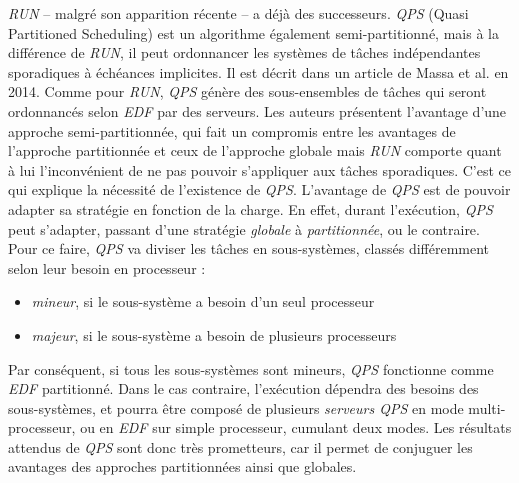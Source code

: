 	\textit{RUN} -- malgré son apparition récente -- a déjà des successeurs. \textit{QPS}
	(Quasi Partitioned Scheduling) est un algorithme 
	également semi-partitionné, mais à la différence de \textit{RUN}, il peut ordonnancer les systèmes de tâches indépendantes sporadiques à échéances implicites. 
	Il est décrit dans un article de Massa et al. \cite{massa_outstanding_2014} en 2014. 
	Comme pour \textit{RUN}, \textit{QPS} génère des sous-ensembles de tâches qui seront ordonnancés 
	selon \textit{EDF} par des serveurs. Les auteurs présentent l'avantage d'une approche semi-partitionnée, 
	qui fait un compromis entre les avantages de l'approche partitionnée et ceux de l'approche globale 
	mais \textit{RUN} comporte quant à lui l'inconvénient de ne pas pouvoir s'appliquer aux tâches sporadiques. C'est ce qui explique la nécessité de l'existence de \textit{QPS}.
	L'avantage de \textit{QPS} est de pouvoir adapter sa stratégie en fonction de la
	charge. En effet, durant l'exécution, \textit{QPS} peut s'adapter, passant d'une
	stratégie \textit{globale} à \textit{partitionnée}, ou le contraire. 
	Pour ce faire, \textit{QPS} va diviser les tâches en sous-systèmes, classés différemment selon leur besoin en processeur :\medskip
	\begin{itemize}
		\item \textit{mineur}, si le sous-système a besoin d'un seul processeur
		\item \textit{majeur}, si le sous-système a besoin de plusieurs processeurs
	\end{itemize}
	Par conséquent, si tous les sous-systèmes sont mineurs, \textit{QPS} fonctionne comme 
	\textit{EDF} partitionné. Dans le cas contraire, l'exécution dépendra des besoins 
	des sous-systèmes, et pourra être composé de plusieurs \textit{serveurs QPS} 
	en mode multi-processeur, ou en \textit{EDF} sur simple processeur, cumulant 
	deux modes. \medskip
	Les résultats attendus de \textit{QPS} sont donc très prometteurs, car il permet de 
	conjuguer les avantages des approches partitionnées ainsi que globales.
	
	